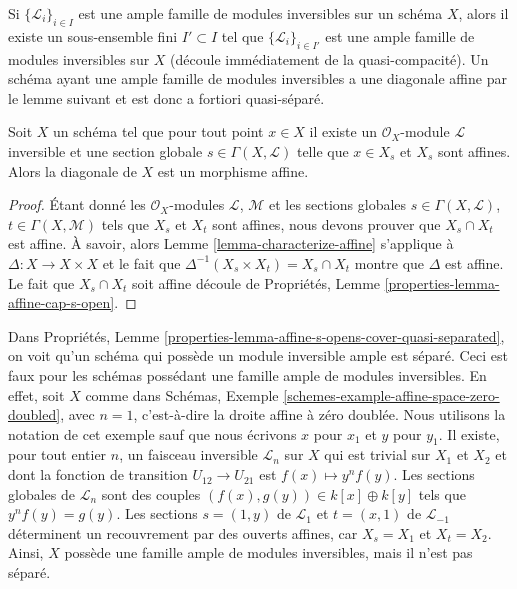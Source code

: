 \noindent
Si $\{\mathcal{L}_i\}_{i \in I}$ est une ample famille de modules inversibles sur un
schéma $X$, alors il existe un sous-ensemble fini $I' \subset I$ tel que
$\{\mathcal{L}_i\}_{i \in I'}$ est une ample famille de modules inversibles sur $X$
(découle immédiatement de la quasi-compacité). Un schéma
ayant une ample famille de modules inversibles a une diagonale
affine par le lemme suivant et est donc a fortiori quasi-séparé.

\begin{lemma}
\label{lemma-affine-diagonal}
Soit $X$ un schéma tel que pour tout point $x \in X$ il existe
un $\mathcal{O}_X$-module $\mathcal{L}$ inversible et une section
globale $s \in \Gamma(X, \mathcal{L})$ telle que $x \in X_s$ et $X_s$ sont affines.
Alors la diagonale de $X$ est un morphisme affine.
\end{lemma}

\begin{proof}
Étant donné les $\mathcal{O}_X$-modules $\mathcal{L}$, $\mathcal{M}$
et les sections globales $s \in \Gamma(X, \mathcal{L})$,
$t \in \Gamma(X, \mathcal{M})$ tels que $X_s$ et $X_t$ sont
affines, nous devons prouver que $X_s \cap X_t$
est affine. À savoir, alors
Lemme \ref{lemma-characterize-affine} s'applique à $\Delta : X \to X \times X$
et le fait que $\Delta^{-1}(X_s \times X_t) = X_s \cap X_t$ montre que $\Delta$
est affine. Le fait que $X_s \cap X_t$ soit affine
découle de Propriétés, Lemme \ref{properties-lemma-affine-cap-s-open}.
\end{proof}

\begin{remark}
\label{remark-affine-s-opens-cover-family}
Dans Propriétés, Lemme \ref{properties-lemma-affine-s-opens-cover-quasi-separated}, on voit qu'un schéma qui possède un module inversible ample
est séparé. Ceci est faux pour les schémas possédant
une famille ample de modules inversibles. En effet,
soit $X$ comme dans Schémas, Exemple \ref{schemes-example-affine-space-zero-doubled},
avec $n = 1$, c'est-à-dire la droite affine à zéro doublée.
Nous utilisons la notation de cet exemple sauf que nous écrivons $x$
pour $x_1$ et $y$ pour $y_1$. Il existe,
pour tout entier $n$, un faisceau inversible $\mathcal{L}_n$
sur $X$ qui est trivial sur $X_1$ et $X_2$
et dont la fonction de transition $U_{12} \to U_{21}$ est $f(x) \mapsto y^n f(y)$.
Les sections globales de $\mathcal{L}_n$ sont
des couples $(f(x), g(y)) \in k[x] \oplus
k[y]$ tels que $y^n f(y) = g(y)$. Les sections $s = (1,
y)$ de $\mathcal{L}_1$ et $t = (x, 1)$ de
$\mathcal{L}_{-1}$ déterminent un recouvrement par des ouverts affines, car
$X_s = X_1$ et $X_t = X_2$. Ainsi, $X$ possède
une famille ample de modules inversibles, mais il n'est pas séparé.
\end{remark}









